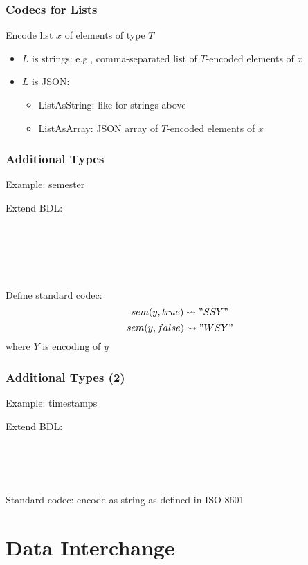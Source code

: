 \begin{frame}\frametitle{Codecs for Lists}
Encode list $x$ of elements of type $T$
\begin{itemize}
\item $L$ is strings: e.g., comma-separated list of $T$-encoded elements of $x$\\
\item $L$ is JSON:
 \begin{itemize}
 \item ListAsString: like for strings above
 \item ListAsArray: JSON array of $T$-encoded elements of $x$
 \end{itemize}
\end{itemize}
\end{frame}


\begin{frame}\frametitle{Additional Types}
Example: semester

Extend BDL:
\begin{commgrammar}
\\
\\
\\
\\
\end{commgrammar}

Define standard codec:
\[sem(y,true) \rightsquigarrow "SSY"\]
\[sem(y,false) \rightsquigarrow "WSY"\]
where $Y$ is encoding of $y$
\end{frame}

\begin{frame}\frametitle{Additional Types (2)}
Example: timestamps

Extend BDL:
\begin{commgrammar}
\\
\\
\\
\end{commgrammar}

Standard codec: encode as string as defined in ISO 8601
\end{frame}

\section{Data Interchange}

